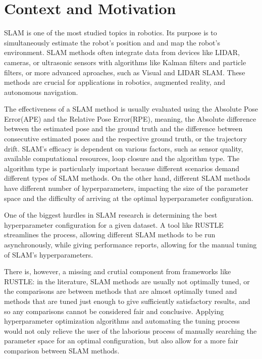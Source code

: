 \section{Context and Motivation}

\par
\ac{SLAM} is one of the most studied topics in robotics. Its purpose is to simultaneously estimate the robot's position and and map the robot's environment. SLAM methods often integrate data from devices like LIDAR, cameras, or ultrasonic sensors with algorithms like Kalman filters and particle filters, or more advanced aproaches, such as Visual and LIDAR SLAM. These methods are crucial for applications in robotics, augmented reality, and autonomous navigation.
\par
The effectiveness of a SLAM method is usually evaluated using the Absolute Pose Error(APE) and the Relative Pose Error(RPE), meaning, the Absolute difference between the estimated pose and the ground truth and the difference between consecutive estimated poses and the respective ground truth, or the trajectory drift. SLAM's efficacy is dependent on various factors, such as sensor quality, available computational resources, loop closure and the algorithm type. The algorithm type is particularly important because different scenarios demand different types of SLAM methods. On the other hand, different SLAM methods have different number of hyperparameters, impacting the size of the parameter space and the difficulty of arriving at the optimal hyperparameter configuration.
\par
One of the biggest hurdles in SLAM research is determining the best hyperparameter configuration for a given dataset. A tool like RUSTLE streamlines the process, allowing different SLAM methods to be run asynchronously, while giving performance reports, allowing for the manual tuning of SLAM's hyperparameters.
\par
There is, however, a missing and crutial component from frameworks like RUSTLE: in the literature, SLAM methods are usually not optimally tuned, or the comparisons are between methods that are almost optimally tuned and methods that are tuned just enough to give sufficiently satisfactory results, and so any comparisons cannot be considered fair and conclusive. Applying hyperparameter optimization algorithms and automating the tuning process would not only relieve the user of the laborious process of manually searching the parameter space for an optimal configuration, but also allow for a more fair comparison between SLAM methods.

